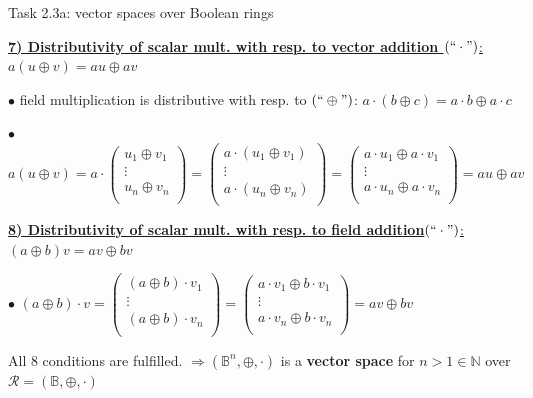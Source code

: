 \documentclass[aspectratio=169]{beamer}
\begin{document}
\begin{frame}{Task 2.3a: vector spaces over Boolean rings}

\underline{\textbf{7) Distributivity of scalar mult. with resp. to vector addition $(``\cdot")$}:} $a(u \oplus v) = au \oplus av$\newline

$\bullet$ field multiplication is distributive with resp. to $(``\oplus")$: $a\cdot (b \oplus c) = a \cdot b \oplus a \cdot c$\newline

$\bullet$ $a(u \oplus v) = a \cdot
\begin{pmatrix}
u_1 \oplus v_1\\
\vdots\\
u_n \oplus v_n\\
\end{pmatrix} =
\begin{pmatrix}
a \cdot (u_1 \oplus v_1)\\
\vdots\\
a \cdot (u_n \oplus v_n)\\
\end{pmatrix} =
\begin{pmatrix}
a \cdot u_1 \oplus a \cdot v_1\\
\vdots\\
a \cdot u_n \oplus a \cdot v_n\\
\end{pmatrix} = au \oplus av$\newline


\underline{\textbf{8) Distributivity of scalar mult. with resp. to field addition$(``\cdot")$}:} $(a \oplus b)v = av \oplus bv$\newline

$\bullet$ $(a \oplus b)\cdot v =
\begin{pmatrix}
(a \oplus b) \cdot v_1\\
\vdots\\
(a \oplus b) \cdot v_n\\
\end{pmatrix} =
\begin{pmatrix}
a \cdot v_1 \oplus b \cdot v_1\\
\vdots\\
a \cdot v_n \oplus b \cdot v_n\\
\end{pmatrix} = av \oplus bv$\newline

All 8 conditions are fulfilled.\newline
$\Rightarrow (\mathbb{B}^n, \oplus, \cdot )$ is a \textbf{vector space} for $n>1\in \mathbb{N}$ over $\mathcal{R} = (\mathbb{B}, \oplus, \cdot )$
\end{frame}
\end{document}
